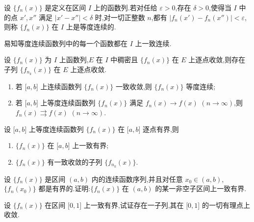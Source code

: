 \documentclass[../数学分析培优讲义.tex]{subfiles}
\begin{document}
\begin{definition}
设 $\{f_n(x)\}$ 是定义在区间 $I$ 上的函数列.若对任给 $\varepsilon>0$,存在 $\delta>0$,使得当 $I$ 中的点 $x',x''$ 满足 $|x'-x''|<\delta$ 时,对一切正整数 $n$,都有 $|f_n(x')-f_n(x'')|<\varepsilon$,则称 $\{f_n(x)\}$ 在 $I$ 上是等度连续的.
\end{definition}

\begin{remark}
易知等度连续函数列中的每一个函数都在 $I$ 上一致连续.
\end{remark}

\begin{theorem}[
\markstar]
设 $\{f_n(x)\}$ 为 $I$ 上函数列,$E$ 在 $I$ 中稠密且 $\{f_n(x)\}$ 在 $E$ 上逐点收敛,则存在子列 $\{f_{n_k}(x)\}$ 在 $E$ 上逐点收敛.
\end{theorem}

\begin{theorem}[\markstar]
\begin{enumerate}[label=(\arabic*)]
    \item 若 $\lbrack a,b\rbrack$ 上连续函数列 $\{f_n(x)\}$ 一致收敛,则 $\{f_n(x)\}$ 等度连续;
    \item 若 $\lbrack a,b\rbrack$ 上等度连续函数列 $\{f_n(x)\}$ 满足 $f_n(x)\to f(x)$ $(n\to\infty)$,则 $f_n(x)\rightrightarrows f(x)$ $(n\to\infty)$.
\end{enumerate}
\end{theorem}

\begin{theorem}[\markstar]
设 $\lbrack a,b\rbrack$ 上等度连续函数列 $\{f_n(x)\}$ 在 $\lbrack a,b\rbrack$ 逐点有界,则
\begin{enumerate}[label=(\arabic*)]
    \item $\{f_n(x)\}$ 在 $\lbrack a,b\rbrack$ 上一致有界;
    \item $\{f_n(x)\}$ 有一致收敛的子列 $\{f_{n_k}(x)\}$.
\end{enumerate}
\end{theorem}

\begin{example}
设 $\{f_n(x)\}$ 是区间 $(a,b)$ 内的连续函数序列,并且对任意 $x_0\in(a,b)$,$\{f_n(x_0)\}$ 都是有界的.证明:$\{f_n(x)\}$ 在 $(a,b)$ 的某一非空子区间上一致有界.
\end{example}
\exampleblank

\begin{example}
设 $\{f_n(x)\}$ 在区间 $\lbrack 0,1\rbrack$ 上一致有界,试证存在一子列,其在 $\lbrack 0,1\rbrack$ 的一切有理点上收敛.
\end{example}
\exampleblank
\end{document}
